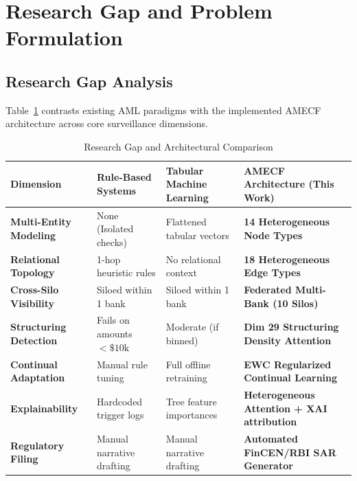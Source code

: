 \documentclass[conference]{IEEEtran}
\begin{document}
\section{Research Gap and Problem Formulation}

\subsection{Research Gap Analysis}
Table~\ref{tab:research_gap} contrasts existing AML paradigms with the implemented AMECF architecture across core surveillance dimensions.

\begin{table}[t]
\caption{Research Gap and Architectural Comparison}
\label{tab:research_gap}
\centering
\small
\begin{tabular}{|p{3.0cm}|p{4.2cm}|p{4.2cm}|p{4.8cm}|}
\hline
\textbf{Dimension} & \textbf{Rule-Based Systems} & \textbf{Tabular Machine Learning} & \textbf{AMECF Architecture (This Work)} \\
\hline
\textbf{Multi-Entity Modeling} & None (Isolated checks) & Flattened tabular vectors & \textbf{14 Heterogeneous Node Types} \\
\hline
\textbf{Relational Topology} & 1-hop heuristic rules & No relational context & \textbf{18 Heterogeneous Edge Types} \\
\hline
\textbf{Cross-Silo Visibility} & Siloed within 1 bank & Siloed within 1 bank & \textbf{Federated Multi-Bank (10 Silos)} \\
\hline
\textbf{Structuring Detection} & Fails on amounts $< \$10\text{k}$ & Moderate (if binned) & \textbf{Dim 29 Structuring Density Attention} \\
\hline
\textbf{Continual Adaptation} & Manual rule tuning & Full offline retraining & \textbf{EWC Regularized Continual Learning} \\
\hline
\textbf{Explainability} & Hardcoded trigger logs & Tree feature importances & \textbf{Heterogeneous Attention + XAI attribution} \\
\hline
\textbf{Regulatory Filing} & Manual narrative drafting & Manual narrative drafting & \textbf{Automated FinCEN/RBI SAR Generator} \\
\hline
\end{tabular}
\end{table}
\end{document}
